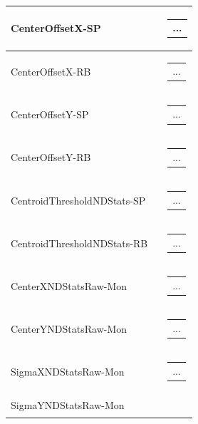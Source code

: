 \documentclass[openany]{article}
\begin{document}
\begin{longtable}{| m{3.0cm} m{4.5cm} m{7.0cm} |}
        CenterOffsetX-SP &  & \begin{tabular}{@{}m{6cm}@{}}
                ...
            \end{tabular} \\ \hline
        CenterOffsetX-RB &  & \begin{tabular}{@{}m{6cm}@{}}
                ...
            \end{tabular} \hypertarget{pv:center-offset-y}{}\\ \hline
        CenterOffsetY-SP &  & \begin{tabular}{@{}m{6cm}@{}}
                ...
            \end{tabular} \\ \hline
        CenterOffsetY-RB &  & \begin{tabular}{@{}m{6cm}@{}}
                ...
            \end{tabular} \hypertarget{}{}\\ \hline
        CentroidThresholdNDStats-SP &  & \begin{tabular}{@{}m{6cm}@{}}
                ...
            \end{tabular} \\ \hline
        CentroidThresholdNDStats-RB &  & \begin{tabular}{@{}m{6cm}@{}}
                ...
            \end{tabular} \hypertarget{pv:center-x-ndstats-raw}{}\\ \hline
        CenterXNDStatsRaw-Mon &  & \begin{tabular}{@{}m{6cm}@{}}
                ...
            \end{tabular} \hypertarget{pv:center-y-ndstats-raw}{}\\ \hline
        CenterYNDStatsRaw-Mon &  & \begin{tabular}{@{}m{6cm}@{}}
                ...
            \end{tabular} \hypertarget{pv:sigma-x-ndstats-raw}{}\\ \hline
        SigmaXNDStatsRaw-Mon &  & \begin{tabular}{@{}m{6cm}@{}}
                ...
            \end{tabular} \hypertarget{pv:sigma-y-ndstats-raw}{}\\ \hline
        SigmaYNDStatsRaw-Mon &  & \begin{tabular}{@{}m{6cm}@{}}

\end{tabular}
\end{longtable}
\end{document}

